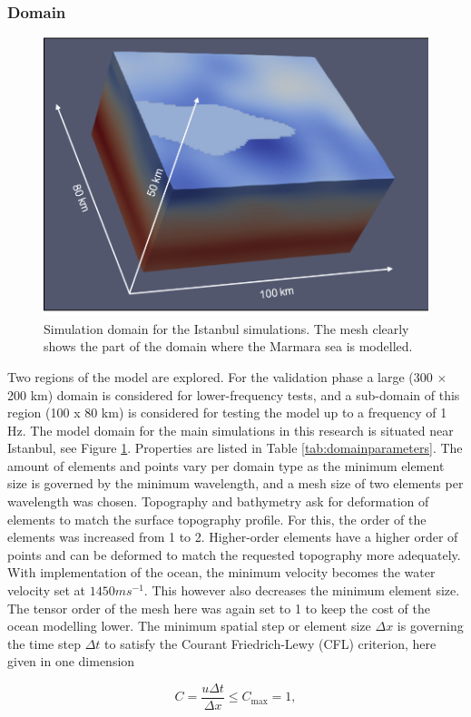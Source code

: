 \documentclass[../Text/00main.tex]{subfiles}
\begin{document}
\subsubsection{Domain}

\begin{figure}
    \centering
    \includegraphics[width=.45\textwidth]{images_methods/paraviewfancyfig.png}
    \caption{Simulation domain for the Istanbul simulations. The mesh clearly shows the part of the domain where the Marmara sea is modelled.}
    \label{fig:fancydomain}
\end{figure}


Two regions of the model are explored. For the validation phase a large (300 $\times$ 200 km) domain is considered for lower-frequency tests, and a sub-domain of this region (100 x 80 km) is considered for testing the model up to a frequency of 1 Hz. The model domain for the main simulations in this research is situated near Istanbul, see Figure \ref{fig:fancydomain}. Properties are listed in Table \ref{tab:domainparameters}. The amount of elements and points vary per domain type as the minimum element size is governed by the minimum wavelength, and a mesh size of two elements per wavelength was chosen. Topography and bathymetry ask for deformation of elements to match the surface topography profile. For this, the order of the elements was increased from 1 to 2. Higher-order elements have a higher order of points and can be deformed to match the requested topography more adequately. With implementation of the ocean, the minimum velocity becomes the water velocity set at $1450 ms^{-1}$. This however also decreases the minimum element size. The tensor order of the mesh here was again set to 1 to keep the cost of the ocean modelling lower. The minimum spatial step or element size $\Delta x$ is governing the time step $\Delta t$ to satisfy the Courant Friedrich-Lewy (CFL) criterion, here given in one dimension

\begin{equation}
C=\frac{u \Delta t}{\Delta x} \leq C_{\max } = 1,
\end{equation}
\end{document}
